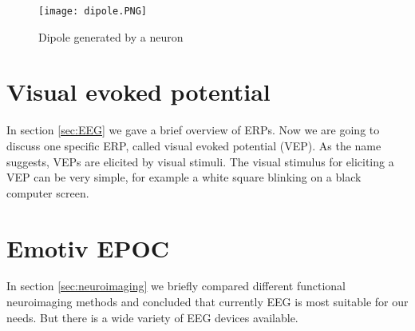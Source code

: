 \begin{figure}[h]
	\centering
	\texttt{[image: dipole.PNG]}
	\caption{Dipole generated by a neuron \cite[p.~669]{neuroscience}}
	\label{fig:dipole}
\end{figure}

\section{Visual evoked potential}

In section \ref{sec:EEG} we gave a brief overview of ERPs. Now we are going to discuss one specific ERP, called visual evoked potential (VEP). As the name suggests, VEPs are elicited by visual stimuli. The visual stimulus for eliciting a VEP can be very simple, for example a white square blinking on a black computer screen.

\section{Emotiv EPOC}

In section \ref{sec:neuroimaging} we briefly compared different functional neuroimaging methods and concluded that currently \acrshort{EEG} is most suitable for our needs. But there is a wide variety of EEG devices available. 
 